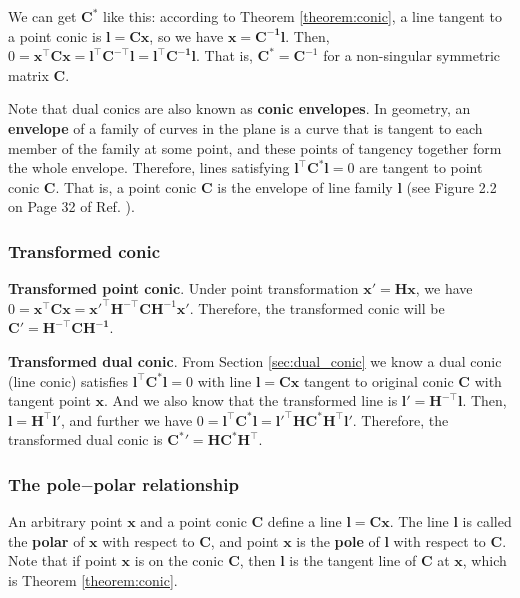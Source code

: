 \documentclass[12pt]{article}
\numberwithin{equation}{section}
\begin{document}
We can get $\mathbf{C}^*$ like this: according to Theorem \ref{theorem:conic}, a line tangent to a point conic is $\mathbf{l} = \mathbf{Cx}$, so we have $\mathbf{x} = \mathbf{C^{-1}l}$. Then, $0 = \mathbf{x^\top C x} = \mathbf{l^\top C^{-\top} l} = \mathbf{l^\top C^{-1} l}$. That is, $\mathbf{C}^* = \mathbf{C}^{-1}$ for a non-singular symmetric matrix $\mathbf{C}$.

Note that dual conics are also known as \textbf{conic envelopes}. In geometry, an \textbf{envelope} of a family of curves in the plane is a curve that is tangent to each member of the family at some point, and these points of tangency together form the whole envelope. Therefore, lines satisfying $\mathbf{l^\top C^* l} = 0$ are tangent to point conic $\mathbf{C}$. That is, a point conic $\mathbf{C}$ is the envelope of line family $\mathbf{l}$ (see Figure 2.2 on Page 32 of Ref. \cite{hartley2003multiple}). 

\subsubsection{Transformed conic}
\label{sec:transformed_conic}

\textbf{Transformed point conic}. Under point transformation $\mathbf{x' = Hx}$, we have $0 = \mathbf{x^\top C x} = \mathbf{x'^\top} \mathbf{H}^{-\top}\mathbf{CH}^{-1}\mathbf{x}'$. Therefore, the transformed conic will be $\mathbf{C}' = \mathbf{\mathbf{H}^{-\top}\mathbf{CH}^{-1}}$.

\textbf{Transformed dual conic}. From Section \ref{sec:dual_conic} we know a dual conic (line conic) satisfies $\mathbf{l^\top C^* l} = 0$ with line $\mathbf{l = Cx}$ tangent to original conic $\mathbf{C}$ with tangent point $\mathbf{x}$. And we also know that the transformed line is $\mathbf{l' = H^{-\top}l}$. Then, $\mathbf{l = H^\top l'}$, and further we have $0 = \mathbf{l^\top C^* l} = \mathbf{l'^\top}\mathbf{HC^* H^\top l'}$. Therefore, the transformed dual conic is $\mathbf{C^*}' = \mathbf{HC^{*} H^\top}$.

\subsubsection{The pole$-$polar relationship}

An arbitrary point $\mathbf{x}$ and a point conic $\mathbf{C}$ define a line $\mathbf{l = Cx}$. The line $\mathbf{l}$ is called the \textbf{polar} of $\mathbf{x}$ with respect to $\mathbf{C}$, and point $\mathbf{x}$ is the \textbf{pole} of $\mathbf{l}$ with respect to $\mathbf{C}$. Note that if point $\mathbf{x}$ is on the conic $\mathbf{C}$, then $\mathbf{l}$ is the tangent line of $\mathbf{C}$ at $\mathbf{x}$, which is Theorem \ref{theorem:conic}. \\
\end{document}
